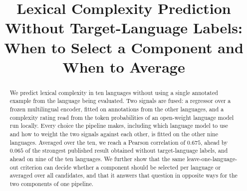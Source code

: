\usepackage[utf8]{inputenc}

\usepackage{microtype}

\usepackage{inconsolata}

\usepackage{graphicx}

\usepackage{booktabs}          %

\renewcommand{\topfraction}{0.9}
\renewcommand{\bottomfraction}{0.5}
\renewcommand{\textfraction}{0.08}
\renewcommand{\floatpagefraction}{0.8}

%
%

\title{Lexical Complexity Prediction Without Target-Language Labels:\\
       When to Select a Component and When to Average}

\author{}


\maketitle

\begin{abstract}
We predict lexical complexity in ten languages without using a single
annotated example from the language being evaluated. Two signals are
fused: a regressor over a frozen multilingual encoder, fitted on
annotations from the other languages, and a complexity rating read from
the token probabilities of an open-weight language model run locally.
Every choice the pipeline makes, including which language model to use
and how to weight the two signals against each other, is fitted on the
other nine languages. Averaged over the ten, we reach a Pearson
correlation of $0.675$, ahead by $0.065$ of the strongest published
result obtained without target-language labels, and ahead on nine of the
ten languages. We further show that the same leave-one-language-out
criterion can decide whether a component should be selected per language
or averaged over all candidates, and that it answers that question in
opposite ways for the two components of one pipeline.
\end{abstract}

